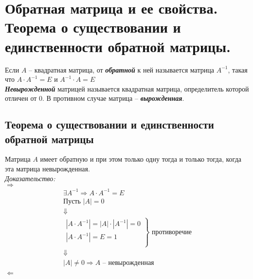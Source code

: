 \documentclass[12pt, fleqn]{article}
\begin{document}
\section{Обратная матрица и ее свойства. Теорема о существовании и единственности обратной матрицы.}
Если $A$ -- квадратная матрица, от \textbf{\textit{обратной}} к ней называется матрица $A^{-1}$, такая что $A\cdot A^{-1} = E$ и $A^{-1}\cdot A = E$\\
\textbf{\textit{Невырожденной}} матрицей называется квадратная матрица, определитель которой отличен от 0. В противном случае матрица -- \textbf{\textit{вырожденная}}.
\subsection*{Теорема о существовании и единственности обратной матрицы}
Матрица $A$ имеет обратную и при этом только одну тогда и только тогда, когда эта матрица невырожденная.\\
\textit{Доказательство:}\\
$\boxed{\Rightarrow}$
\begin{multline*}
	\exists A^{-1}\Rightarrow A\cdot A^{-1} = E\\
	\text{Пусть } \left|A\right| = 0\\
	\Downarrow\\
	\left.\begin{gathered}
		\left|A\cdot A^{-1}\right| = \left|A\right|\cdot \left|A^{-1}\right| = 0\\
		\left|A\cdot A^{-1}\right| = E = 1\\
	\end{gathered}\right\} \text{ противоречие}\\
	\Downarrow\\
	|A| \neq 0 \Rightarrow A \text{ -- невырожденная}\\
\end{multline*}
$\boxed{\Leftarrow}$
\end{document}
